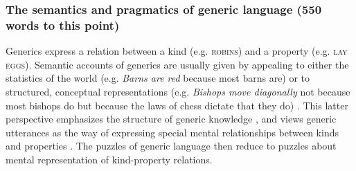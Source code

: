 \documentclass[10pt,letterpaper]{article}
\begin{document}
\subsubsection*{The semantics and pragmatics of generic language  (550 words to this point)}

Generics express a relation between a kind (e.g. \textsc{robins}) and a property (e.g. \textsc{lay eggs}). 
Semantic accounts of generics are usually given by appealing to either the statistics of the world (e.g. \emph{Barns are red} because most barns are) or to structured, conceptual representations (e.g. \emph{Bishops move diagonally} not because most bishops do but because the laws of chess dictate that they do) \cite{Carlson1995essay}. 
This latter perspective emphasizes the structure of generic knowledge \cite{Prasada2000}, and views generic utterances as the way of expressing special mental relationships between kinds and properties \cite{Leslie2008, Prasada2012}. The puzzles of generic language then reduce to puzzles about mental representation of kind-property relations.

%


\end{document}
